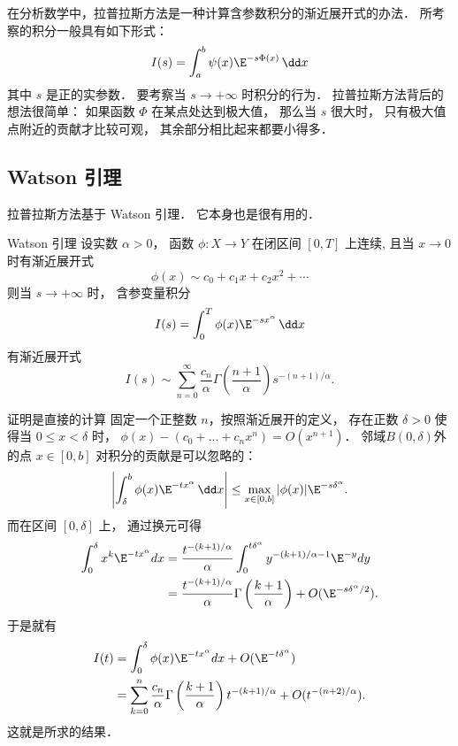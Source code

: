 

在分析数学中，拉普拉斯方法是一种计算含参数积分的渐近展开式的办法． 所考察的积分一般具有如下形式：
\begin{equation}\label{LapAsm_eq1}
I(s)=\int_a^b\psi(x)\E^{-s\Phi(x)}\,\dd x
\end{equation}
其中 $s$ 是正的实参数． 要考察当 $s\to+\infty$ 时积分的行为． 拉普拉斯方法背后的想法很简单： 如果函数 $\Phi$ 在某点处达到极大值， 那么当 $s$ 很大时， 只有极大值点附近的贡献才比较可观， 其余部分相比起来都要小得多．

\subsection{Watson 引理}
拉普拉斯方法基于 Watson 引理． 它本身也是很有用的．

\begin{lemma}{Watson 引理}
设实数 $\alpha>0$， 函数 $\phi:X\to Y$ 在闭区间 $[0,T]$ 上连续, 且当 $x\to0$ 时有渐近展开式
\[
  \phi(x)\sim c_0+c_1x+c_2x^2+\cdots
\]
则当 $s\to+\infty$ 时， 含参变量积分
\[
  I(s)=\int_0^T \phi(x)\E^{-s x^\alpha}\,\dd x
\]
有渐近展开式
\[
  I(s)\sim\sum_{n=0}^\infty \frac{c_n}{\alpha}\Gamma\left(\frac{n+1}{\alpha}\right)s^{-(n+1)/\alpha}.
\]
\end{lemma}

证明是直接的计算 固定一个正整数 $n$，按照渐近展开的定义， 存在正数 $\delta >0$ 使得当 $0\leq x<\delta$ 时， $\phi(x)-(c_0+...+c_nx^n)=O(x^{n+1})$． 邻域$B(0,\delta)$外的点 $x\in[0,b]$ 对积分的贡献是可以忽略的：
$$
\left|\int_\delta^b\phi(x)\E^{-tx^\alpha}\,\dd x\right|
\leq\max_{x\in[0,b]}|\phi(x)|\E^{-s\delta^\alpha}.
$$
而在区间 $[0,\delta]$ 上， 通过换元可得
$$
\begin{aligned}
\int_0^\delta x^k\E^{-tx^\alpha}dx
&=\frac{t^{-(k+1)/\alpha}}{\alpha}\int_0^{t\delta^\alpha}y^{-(k+1)/\alpha-1}\E^{-y}dy\\
&=\frac{t^{-(k+1)/\alpha}}{\alpha}\Gamma\left(\frac{k+1}{\alpha}\right)+O(\E^{-s\delta^\alpha/2}).
\end{aligned}
$$
于是就有
$$
\begin{aligned}
I(t)
&=\int_0^\delta\phi(x)\E^{-tx^\alpha}dx+O(\E^{-t\delta^\alpha})\\
&=\sum_{k=0}^n\frac{c_n}{\alpha}\Gamma\left(\frac{k+1}{\alpha}\right)t^{-(k+1)/\alpha}+O(t^{-(n+2)/\alpha}).
\end{aligned}
$$
这就是所求的结果．

